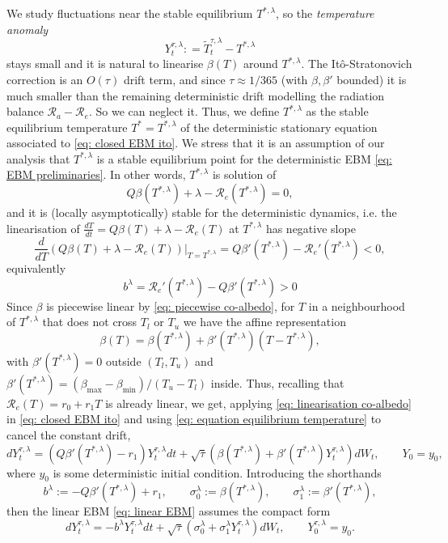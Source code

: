 \documentclass[10pt]{amsart}
\numberwithin{equation}{section}
\begin{document}
We study fluctuations near the stable equilibrium $T^{*,\lambda}$, so the \emph{temperature anomaly} $$
Y_t ^{\tau,\lambda}: = \widetilde T_t^{\tau,\lambda}- T^{*, \lambda}
$$ stays small and it is natural to linearise $\beta(T)$ around $T^{*,\lambda}$. The It\^{o}-Stratonovich correction is an $O(\tau)$ drift term, and since $ \tau \approx 1/365$ (with $\beta, \beta '$ bounded) it is much smaller than the remaining  deterministic drift  modelling the radiation balance $\mathcal{R}_a- \mathcal{R}_e $. So we can neglect it. Thus, we define $T^{*,\lambda}$ as the stable equilibrium temperature $T^* = T^{*,\lambda}$ of the deterministic stationary equation associated to \eqref{eq: closed EBM ito}. We stress that it is an assumption of our analysis that $T^{*,\lambda}$ is a stable equilibrium point for the deterministic EBM \eqref{eq: EBM preliminaries}. In other words, $T^{*,\lambda}$ is solution of
\begin{equation}
    Q \beta(T^{*,\lambda}) + \lambda - \mathcal{R}_e(T^{*,\lambda})  = 0,
    \label{eq: equation equilibrium temperature}
\end{equation}
and it is (locally asymptotically) stable for the deterministic dynamics, i.e. the linearisation of
$\frac{d T}{dt} = Q\beta(T)+\lambda-\mathcal R_e(T)$ at $T^{*,\lambda}$ has negative slope
$$
\frac{d}{dT}(Q\beta(T)+\lambda-\mathcal R_e(T))|_{T=T^{*,\lambda}}
=Q\beta'(T^{*,\lambda})-\mathcal R_e'(T^{*,\lambda})<0,
$$
equivalently 
\begin{equation}
b^\lambda=\mathcal R_e'(T^{*,\lambda})-Q\beta'(T^{*,\lambda})>0
\label{eq: b positive section 1}
\end{equation}
Since $\beta$ is piecewise linear by \eqref{eq: piecewise co-albedo}, for $T$ in a neighbourhood of $T^{*,\lambda}$ that does not cross $T_l$ or $T_u$ we have the affine representation
\begin{equation}
    \beta (T) = \beta (T^{*,\lambda })+ \beta'(T^{*,\lambda}) (T - T^{*,\lambda}),
    \label{eq: linearisation co-albedo}
\end{equation}
with $\beta'(T^{*,\lambda})=0$ outside $(T_l,T_u)$ and $\beta'(T^{*,\lambda})=(\beta_{\max}-\beta_{\min})/(T_u-T_l)$ inside. Thus, recalling that $\mathcal{R}_e (T) = r_0 +r_1T$ is already linear, we get, applying \eqref{eq: linearisation co-albedo} in \eqref{eq: closed EBM ito} and using \eqref{eq: equation equilibrium temperature} to cancel the constant drift,
\begin{equation}
    dY_t ^{\tau,\lambda} = \left( Q  \beta'(T^{*,\lambda}) -r_1\right) Y_t ^{\tau,\lambda} dt + \sqrt{\tau }\left(  \beta(T^{*,\lambda}) + \beta'(T^{*,\lambda}) Y_t ^{\tau,\lambda}\right) dW_t, \qquad Y_0 = y_0,
    \label{eq: linear EBM}
\end{equation}
where $y_0$ is some deterministic initial condition. Introducing the shorthands
$$
b^\lambda := -Q  \beta'(T^{*,\lambda}) +r_1, \qquad \sigma_0^\lambda := \beta(T^{*,\lambda}), \qquad \sigma_1^\lambda := \beta'(T^{*,\lambda}),
$$
then the linear EBM \eqref{eq: linear EBM} assumes the compact form
$$
d Y_t ^{\tau,\lambda} = -b^\lambda Y_t ^{\tau,\lambda} dt + \sqrt{\tau  }(\sigma_0^\lambda + \sigma_1^\lambda Y_t ^{\tau,\lambda}) dW_t, \qquad Y_0^{\tau,\lambda} = y_0.
$$
\end{document}
